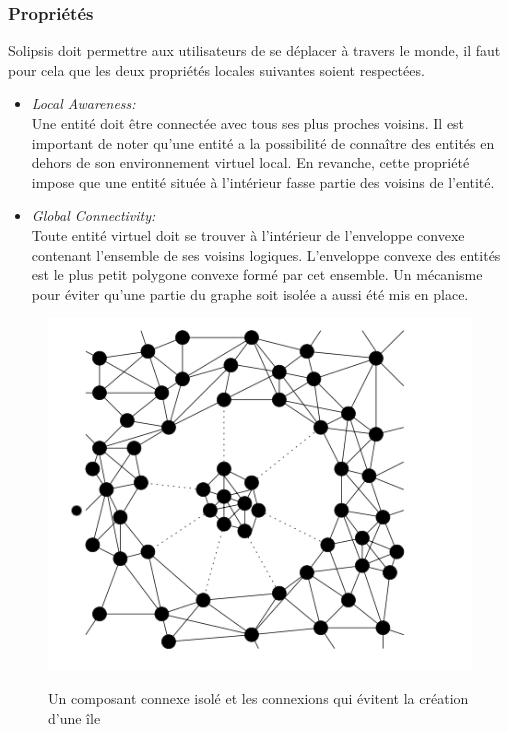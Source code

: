		\subsubsection{Propriétés}
	Solipsis doit permettre aux utilisateurs de se déplacer à travers le monde, il faut pour cela que les deux propriétés locales suivantes soient respectées.
	\begin{itemize}
	\renewcommand{\labelitemi}{$\bullet$}
		\item \textit{Local Awareness:}\\
		Une entité doit être connectée avec tous ses plus proches voisins. Il est important de noter qu'une entité a la possibilité de connaître des entités en dehors de son environnement virtuel local. En revanche, cette propriété impose que une entité située à l'intérieur fasse partie des voisins de l'entité.	
		\item \textit{Global Connectivity:}\\
		Toute entité virtuel doit se trouver à l'intérieur de l'enveloppe convexe contenant l'ensemble de ses voisins logiques. L'enveloppe convexe des entités est le plus petit polygone convexe formé par cet ensemble. Un mécanisme pour éviter qu'une partie du graphe soit isolée a aussi été mis en place.\\

	\end{itemize}
        \vspace{1cm}
	\begin{figure}[!h]
	\centering
        \includegraphics[scale=0.9]{./Ressources/Images/composant_isole1.png}\\
        \caption{Un composant connexe isolé et les connexions qui évitent la création d'une île}
        \label{Envelop_Convex}
        \end{figure}

